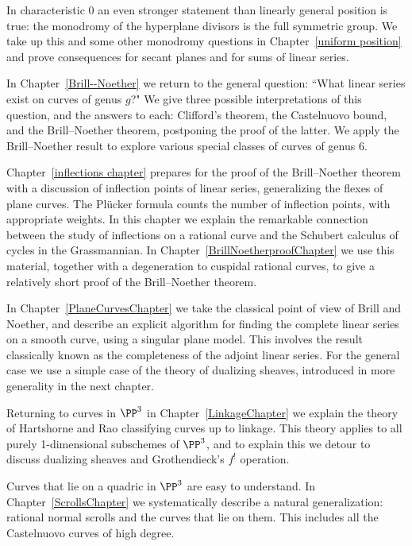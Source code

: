 In characteristic 0 an even stronger statement than linearly general position is true: the monodromy of the hyperplane divisors is the full symmetric group. We take up this
and some other monodromy questions in Chapter~\ref{uniform position} and prove consequences
for secant planes and for sums of linear series.

In Chapter~\ref{Brill--Noether} we return to the general question:
``What linear series exist on curves of genus $g$?" We give three
possible interpretations of this question, and the answers to each:
Clifford's theorem, the Castelnuovo bound, and the Brill--Noether
theorem, postponing the proof of the latter.
We apply the Brill--Noether result to explore  various special classes of curves of genus 6.

Chapter~\ref{inflections chapter} prepares for the proof of the Brill--Noether theorem 
with a discussion of inflection points of linear series, generalizing the flexes of plane curves. The Pl\"ucker formula
counts the number of inflection points, with appropriate weights. In this chapter we explain
the remarkable connection between the study of inflections on a rational curve and the Schubert calculus of cycles in the Grassmannian. In Chapter~\ref{BrillNoetherproofChapter} we use this material, together with a degeneration to cuspidal rational curves, to give a relatively short proof of the Brill--Noether theorem.

In Chapter~\ref{PlaneCurvesChapter} we take the classical point of view of Brill and Noether,
and describe an explicit algorithm for finding the complete linear series on a smooth curve, using a singular plane model. This involves the result classically known as the completeness of the adjoint linear series. For the general case we use a simple case of the theory of dualizing sheaves, introduced in more generality in the next chapter.

Returning to curves in $\PP^{3}$ in Chapter~\ref{LinkageChapter} we explain the theory of Hartshorne and Rao classifying curves up to linkage. This theory applies to all purely 1-dimensional subschemes of $\PP^{3}$, and to explain this
we detour to discuss dualizing sheaves and Grothendieck's $f^{!}$ operation.

Curves that lie on a quadric in $\PP^3$ are easy to understand. In Chapter~\ref{ScrollsChapter} we systematically describe a natural generalization: rational normal scrolls and the curves that lie on them. This includes all the Castelnuovo curves of high degree. 

